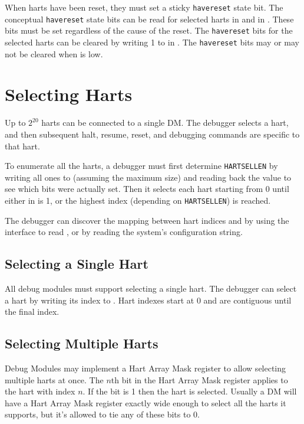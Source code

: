 When harts have been reset, they must set a sticky {\tt havereset} state bit.
The conceptual {\tt havereset} state bits can be read for selected harts in
\FdmDmstatusAnyhavereset and \FdmDmstatusAllhavereset in \RdmDmstatus.
These bits must be set regardless of the cause of the reset.
The {\tt havereset} bits for the selected harts
can be cleared by writing 1 to \FdmDmcontrolAckhavereset in \RdmDmcontrol.
The {\tt havereset} bits may or may not be cleared
when \FdmDmcontrolDmactive is low.

\section{Selecting Harts} \label{selectingharts}

Up to $2^{20}$ harts can be connected to a single DM. The debugger
selects a hart, and then subsequent halt, resume, reset, and debugging
commands are specific to that hart.

To enumerate all the harts, a debugger must first determine {\tt HARTSELLEN}
by writing  all ones to \Fhartsel (assuming the maximum size) and reading back
the value to see which bits were actually set.  Then it selects each hart
starting from 0 until either \FdmDmstatusAnynonexistent in \RdmDmstatus is 1, or the
highest index (depending on {\tt HARTSELLEN}) is reached.

The debugger can discover the mapping between hart indices and
\Rmhartid by using the interface to read \Rmhartid, or by
reading the system's configuration string.

\subsection {Selecting a Single Hart}

All debug modules must support selecting a single hart.
The debugger can select a hart by writing its index to \Fhartsel.
Hart indexes start at 0 and are contiguous until the final index.

\subsection {Selecting Multiple Harts} \label{hartarraymask}

Debug Modules may implement a Hart Array Mask register to allow selecting
multiple harts at once. The $n$th bit in the Hart Array Mask register applies to
the hart with index $n$. If the bit is 1 then the hart is selected.  Usually a DM
will have a Hart Array Mask register exactly wide enough to select all the
harts it supports, but it's allowed to tie any of these bits to 0.

